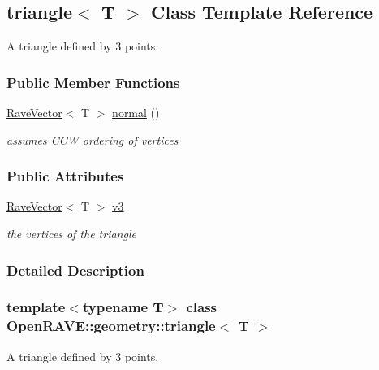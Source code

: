 \hypertarget{classOpenRAVE_1_1geometry_1_1triangle}{
\subsection{triangle$<$ T $>$ Class Template Reference}
\label{classOpenRAVE_1_1geometry_1_1triangle}
}


A triangle defined by 3 points.  


\subsubsection*{Public Member Functions}
\begin{DoxyCompactItemize}
\item 
\hypertarget{classOpenRAVE_1_1geometry_1_1triangle_af4d87900d43b4538e692a34a4ebb5964}{
\hyperlink{classOpenRAVE_1_1geometry_1_1RaveVector}{RaveVector}$<$ T $>$ \hyperlink{classOpenRAVE_1_1geometry_1_1triangle_af4d87900d43b4538e692a34a4ebb5964}{normal} ()}
\label{classOpenRAVE_1_1geometry_1_1triangle_af4d87900d43b4538e692a34a4ebb5964}

\begin{DoxyCompactList}\small\item\em assumes CCW ordering of vertices \item\end{DoxyCompactList}\end{DoxyCompactItemize}
\subsubsection*{Public Attributes}
\begin{DoxyCompactItemize}
\item 
\hypertarget{classOpenRAVE_1_1geometry_1_1triangle_ac7fe127146278408bbe3b94d37d6e076}{
\hyperlink{classOpenRAVE_1_1geometry_1_1RaveVector}{RaveVector}$<$ T $>$ \hyperlink{classOpenRAVE_1_1geometry_1_1triangle_ac7fe127146278408bbe3b94d37d6e076}{v3}}
\label{classOpenRAVE_1_1geometry_1_1triangle_ac7fe127146278408bbe3b94d37d6e076}

\begin{DoxyCompactList}\small\item\em the vertices of the triangle \item\end{DoxyCompactList}\end{DoxyCompactItemize}


\subsubsection{Detailed Description}
\subsubsection*{template$<$typename T$>$ class OpenRAVE::geometry::triangle$<$ T $>$}

A triangle defined by 3 points. 